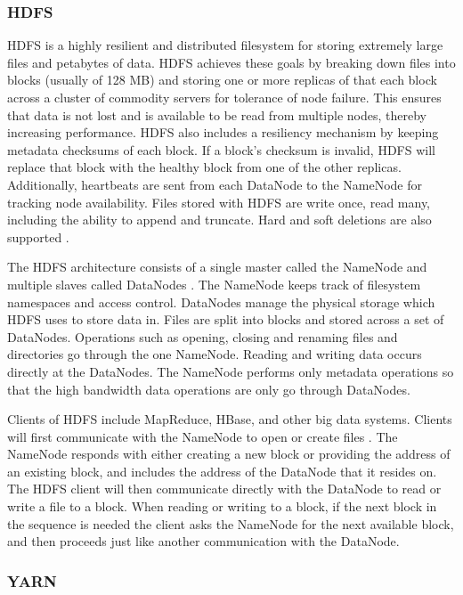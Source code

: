 \documentclass[12pt]{article}
\begin{document}
\subsubsection{HDFS}

HDFS \cite{hdfs} is a highly resilient and distributed filesystem for storing extremely large files and petabytes of data. HDFS achieves these goals by breaking down files into blocks (usually of 128 MB) and storing one or more replicas of that each block across a cluster of commodity servers for tolerance of node failure. This ensures that data is not lost and is available to be read from multiple nodes, thereby increasing performance. HDFS also includes a resiliency mechanism by keeping metadata checksums of each block. If a block's checksum is invalid, HDFS will replace that block with the healthy block from one of the other replicas. Additionally, heartbeats are sent from each DataNode to the NameNode for tracking node availability. Files stored with HDFS are write once, read many, including the ability to append and truncate. Hard and soft deletions are also supported \cite{singh2015survey}.

The HDFS architecture consists of a single master called the NameNode and multiple slaves called DataNodes \cite{hdfsarchitecture}. The NameNode keeps track of filesystem namespaces and access control. DataNodes manage the physical storage which HDFS uses to store data in. Files are split into blocks and stored across a set of DataNodes. Operations such as opening, closing and renaming files and directories go through the one NameNode. Reading and writing data occurs directly at the DataNodes. The NameNode performs only metadata operations so that the high bandwidth data operations are only go through DataNodes.

Clients of HDFS include MapReduce, HBase, and other big data systems. Clients will first communicate with the NameNode to open or create files \cite{hdfsarchitecture}. The NameNode responds with either creating a new block or providing the address of an existing block, and includes the address of the DataNode that it resides on. The HDFS client will then communicate directly with the DataNode to read or write a file to a block. When reading or writing to a block, if the next block in the sequence is needed the client asks the NameNode for the next available block, and then proceeds just like another communication with the DataNode.



\subsubsection{YARN}
\end{document}
